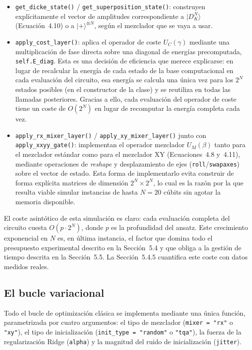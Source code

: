 \begin{itemize}
    \item \texttt{get\_dicke\_state()} / \texttt{get\_superposition\_state()}: construyen explícitamente el vector de amplitudes correspondiente a $|D_K^N\rangle$ (Ecuación~4.10) o a $|+\rangle^{\otimes N}$, según el mezclador que se vaya a usar.
    \item \texttt{apply\_cost\_layer()}: aplica el operador de coste $U_C(\gamma)$ mediante una multiplicación de fase directa sobre una diagonal de energías precomputada, \texttt{self.E\_diag}. Esta es una decisión de eficiencia que merece explicarse: en lugar de recalcular la energía de cada estado de la base computacional en cada evaluación del circuito, esa energía se calcula una única vez para los $2^N$ estados posibles (en el constructor de la clase) y se reutiliza en todas las llamadas posteriores. Gracias a ello, cada evaluación del operador de coste tiene un coste de $O(2^N)$ en lugar de recomputar la energía completa cada vez.
    \item \texttt{apply\_rx\_mixer\_layer()} / \texttt{apply\_xy\_mixer\_layer()} junto con \texttt{apply\_xxyy\_gate()}: implementan el operador mezclador $U_M(\beta)$ tanto para el mezclador estándar como para el mezclador XY (Ecuaciones~4.8 y~4.11), mediante operaciones de \textit{reshape} y desplazamiento de ejes (\texttt{roll}/\texttt{swapaxes}) sobre el vector de estado. Esta forma de implementarlo evita construir de forma explícita matrices de dimensión $2^N \times 2^N$, lo cual es la razón por la que resulta viable simular instancias de hasta $N=20$ cúbits sin agotar la memoria disponible.
\end{itemize}

El coste asintótico de esta simulación es claro: cada evaluación completa del circuito cuesta $O(p \cdot 2^N)$, donde $p$ es la profundidad del ansatz. Este crecimiento exponencial en $N$ es, en última instancia, el factor que domina todo el presupuesto experimental descrito en la Sección~5.4 y que obliga a la gestión de tiempo descrita en la Sección~5.5. La Sección~5.4.5 cuantifica este coste con datos medidos reales.

\subsection{El bucle variacional}

Todo el bucle de optimización clásica se implementa mediante una única función, parametrizada por cuatro argumentos: el tipo de mezclador (\texttt{mixer = "rx"} o \texttt{"xy"}), el tipo de inicialización (\texttt{init\_type = "random"} o \texttt{"tqa"}), la fuerza de la regularización Ridge (\texttt{alpha}) y la magnitud del ruido de inicialización (\texttt{jitter}).

